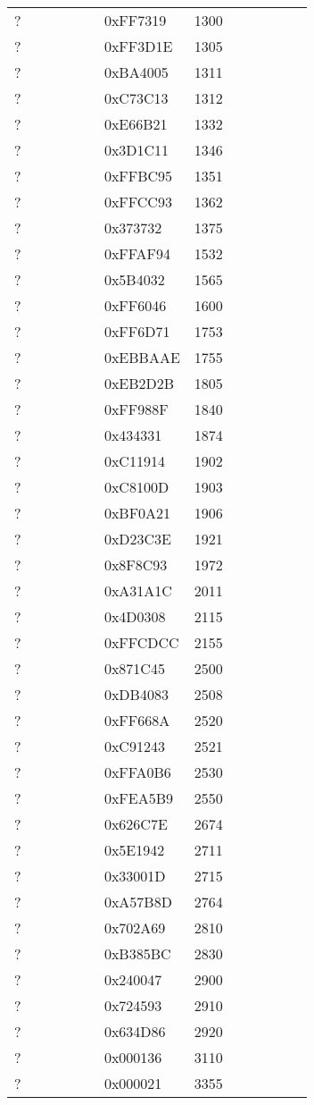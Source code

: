 \begin{longtable}{p{0.3\linewidth} p{0.3\linewidth} p{0.4\linewidth}}
? & 0xFF7319 & 1300\\
? & 0xFF3D1E & 1305\\
? & 0xBA4005 & 1311\\
? & 0xC73C13 & 1312\\
? & 0xE66B21 & 1332\\
? & 0x3D1C11 & 1346\\
? & 0xFFBC95 & 1351\\
? & 0xFFCC93 & 1362\\
? & 0x373732 & 1375\\
? & 0xFFAF94 & 1532\\
? & 0x5B4032 & 1565\\
? & 0xFF6046 & 1600\\
? & 0xFF6D71 & 1753\\
? & 0xEBBAAE & 1755\\
? & 0xEB2D2B & 1805\\
? & 0xFF988F & 1840\\
? & 0x434331 & 1874\\
? & 0xC11914 & 1902\\
? & 0xC8100D & 1903\\
? & 0xBF0A21 & 1906\\
? & 0xD23C3E & 1921\\
? & 0x8F8C93 & 1972\\
? & 0xA31A1C & 2011\\
? & 0x4D0308 & 2115\\
? & 0xFFCDCC & 2155\\
? & 0x871C45 & 2500\\
? & 0xDB4083 & 2508\\
? & 0xFF668A & 2520\\
? & 0xC91243 & 2521\\
? & 0xFFA0B6 & 2530\\
? & 0xFEA5B9 & 2550\\
? & 0x626C7E & 2674\\
? & 0x5E1942 & 2711\\
? & 0x33001D & 2715\\
? & 0xA57B8D & 2764\\
? & 0x702A69 & 2810\\
? & 0xB385BC & 2830\\
? & 0x240047 & 2900\\
? & 0x724593 & 2910\\
? & 0x634D86 & 2920\\
? & 0x000136 & 3110\\
? & 0x000021 & 3355\\

\end{longtable}

